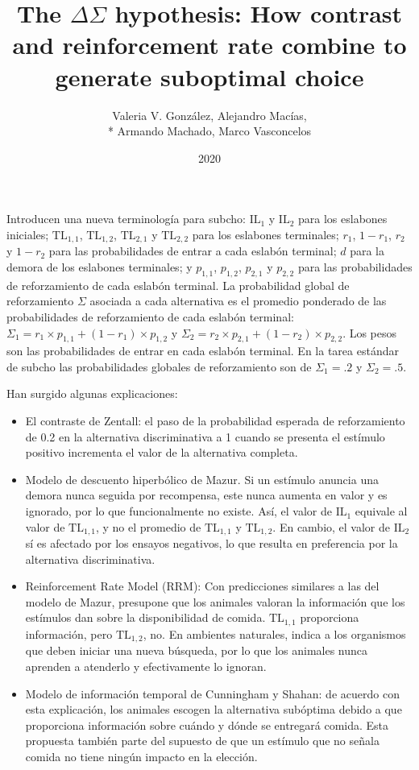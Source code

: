 \documentclass[a4paper,12pt]{article}
\title{The $\Delta\Sigma$ hypothesis: How contrast and reinforcement rate combine to generate suboptimal choice}
\author{Valeria V. González, Alejandro Macías,\\* Armando Machado, Marco Vasconcelos}
\date{2020}
\begin{document}
{\scshape\bfseries \maketitle}

Introducen una nueva terminología para subcho: $\mbox{IL}_1$ y $\mbox{IL}_2$  para los eslabones iniciales; $\mbox{TL}_{1,1}$, $\mbox{TL}_{1,2}$, $\mbox{TL}_{2,1}$ y $\mbox{TL}_{2,2}$ para los eslabones terminales; $r_1$, $1-r_1$, $r_2$ y $1-r_2$ para las probabilidades de entrar a cada eslabón terminal; $d$ para la demora de los eslabones terminales; y $p_{1,1}$, $p_{1,2}$, $p_{2,1}$ y $p_{2,2}$ para las probabilidades de reforzamiento de cada eslabón terminal. La probabilidad global de reforzamiento $\Sigma$ asociada a cada alternativa es el promedio ponderado de las probabilidades de reforzamiento de cada eslabón terminal: $\Sigma_1=r_1\times p_{1,1}+(1-r_1)\times p_{1,2}$ y  $\Sigma_2=r_2\times p_{2,1}+(1-r_2)\times p_{2,2}$. Los pesos son las probabilidades de entrar en cada eslabón terminal. En la tarea estándar de subcho las probabilidades globales de reforzamiento son de $\Sigma_1={.}2$ y $\Sigma_2={.}5$.

Han surgido algunas explicaciones: 
\begin{itemize}
	\item El contraste de Zentall: el paso de la probabilidad esperada de reforzamiento de 0.2 en la alternativa discriminativa a 1 cuando se presenta el estímulo positivo incrementa el valor de la alternativa completa.
	\item Modelo de descuento hiperbólico de Mazur. Si un estímulo anuncia una demora nunca seguida por recompensa, este nunca aumenta en valor y es ignorado, por lo que funcionalmente no existe. Así, el valor de $\mbox{IL}_1$ equivale al valor de $\mbox{TL}_{1,1}$, y no el promedio de $\mbox{TL}_{1,1}$ y $\mbox{TL}_{1,2}$. En cambio, el valor de $\mbox{IL}_2$ sí es afectado por los ensayos negativos, lo que resulta en preferencia por la alternativa discriminativa.
	\item Reinforcement Rate Model (RRM): Con predicciones similares a las del modelo de Mazur, presupone que los animales valoran la información que los estímulos dan sobre la disponibilidad de comida. $\mbox{TL}_{1,1}$ proporciona información, pero $\mbox{TL}_{1,2}$, no. En ambientes naturales, indica a los organismos que deben iniciar una nueva búsqueda, por lo que los animales nunca aprenden a atenderlo y efectivamente lo ignoran.
	\item Modelo de información temporal de Cunningham y Shahan: de acuerdo con esta explicación, los animales escogen la alternativa subóptima debido a que proporciona información sobre cuándo y dónde se entregará comida. Esta propuesta también parte del supuesto de que un estímulo que no señala comida no tiene ningún impacto en la elección.
\end{itemize}
\end{document}
